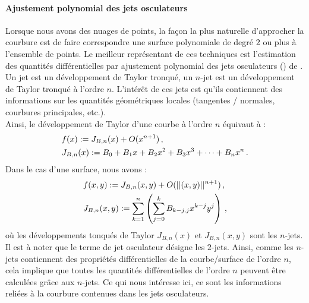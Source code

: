 \paragraph{Ajustement polynomial des jets osculateurs}
%
Lorsque nous avons des nuages de points, la façon la plus naturelle d'approcher
la courbure est de faire correspondre une surface polynomiale de degré $2$ ou
plus à l'ensemble de points. Le meilleur représentant de ces techniques est
l'estimation des quantités différentielles par ajustement polynomial des jets
osculateurs () de . Un jet
est un développement de Taylor tronqué, un $n$-jet est un développement de
Taylor tronqué à l'ordre $n$. L'intérêt de ces jets est qu'ils contiennent des
informations sur les quantités géométriques locales (tangentes / normales,
courbures principales, etc.).
%
\\
%
Ainsi, le développement de Taylor d'une courbe à l'ordre $n$ équivaut à :
%
\begin{align}
  &f(x) := J_{B,n}(x) + O(x^{n+1}) \,, \\
  &J_{B,n}(x) := B_0 + B_1x + B_2x^2 + B_3x^3 + \cdots + B_nx^n \,.
\end{align}
%
Dans le cas d'une surface, nous avons :
%
\begin{align}
  &f(x,y) := J_{B,n}(x,y) + O(||(x,y)||^{n+1}) \,, \\
  &J_{B,n}(x,y) := \sum_{k=1}^{n} \left( \sum_{j=0}^{k} B_{k-j,j}x^{k-j}y^j \right) \,,
\end{align}
%
où les développements tonqués de Taylor $J_{B,n}(x)$ et $J_{B,n}(x,y)$ sont les
$n$-jets. Il est à noter que le terme de jet osculateur désigne les $2$-jets.
Ainsi, comme les $n$-jets contiennent des propriétés différentielles de la
courbe/surface de l'ordre $n$, cela implique que toutes les quantités
différentielles de l'ordre $n$ peuvent être calculées grâce aux $n$-jets. Ce qui
nous intéresse ici, ce sont les informations reliées à la courbure contenues
dans les jets osculateurs.


